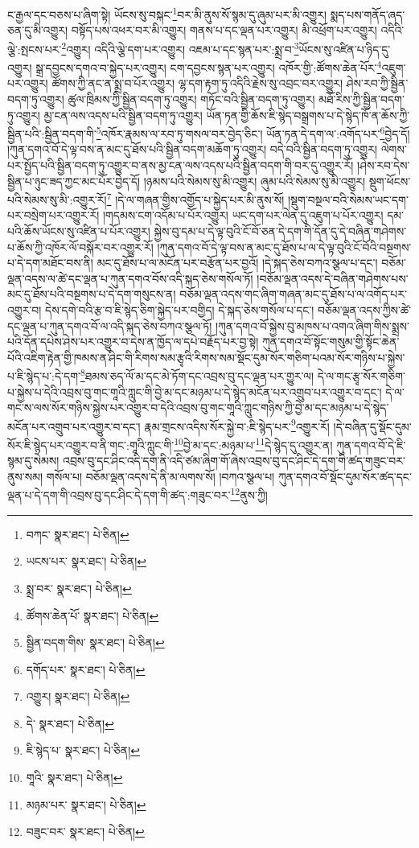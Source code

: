 ང་རྒྱལ་དང་བཅས་པ་ཞིག་སྟེ། ཡོངས་སུ་བསྐང་\footnote{བཀང་  སྣར་ཐང་།  པེ་ཅིན། }བར་མི་ནུས་སོ་སྙམ་དུ་ཞུམ་པར་མི་འགྱུར། སྨད་པས་གནོད་ཞད་ཅན་དུ་མི་འགྱུར། བསྟོད་པས་འཕར་བར་མི་འགྱུར། གནས་པ་དང་ལྡན་པར་འགྱུར། མི་འཕྲོག་པར་འགྱུར། འདིའི་ལྕེ་:སྤངས་པར་\footnote{ཡངས་པར་  སྣར་ཐང་།  པེ་ཅིན། }འགྱུར། འདིའི་ལྕེ་དག་པར་འགྱུར། འཇམ་པ་དང་སྙན་པར་:སྨྲ་བ་\footnote{སྨྲ་བར་  སྣར་ཐང་།  པེ་ཅིན། }ཡོངས་སུ་འཛིན་པ་ཉིད་དུ་འགྱུར། སྒྲ་དབྱངས་དགའ་བ་སྐྱེད་པར་འགྱུར། ངག་དབྱངས་སྙན་པར་འགྱུར། འཁོར་གྱི་:ཚོགས་ཆེན་པོར་\footnote{ཚོགས་ཆེན་པོ་  སྣར་ཐང་།  པེ་ཅིན། }འཇུག་པར་འགྱུར། ཚོགས་ཀྱི་ནང་ན་སྨྲ་བ་པོར་འགྱུར། ལྷ་དག་རྟག་ཏུ་འདིའི་རྗེས་སུ་འབྲང་བར་འགྱུར། ཤེས་རབ་ཀྱི་སྦྱིན་བདག་ཏུ་འགྱུར། ཚུལ་ཁྲིམས་ཀྱི་སྦྱིན་བདག་ཏུ་འགྱུར། གཏོང་བའི་སྦྱིན་བདག་ཏུ་འགྱུར། མཐོ་རིས་ཀྱི་སྦྱིན་བདག་ཏུ་འགྱུར། མྱ་ངན་ལས་འདས་པའི་སྦྱིན་བདག་ཏུ་འགྱུར། ཡོན་ཏན་གྱི་ཆོས་ཇི་སྙེད་བསྒྲགས་པ་དེ་སྙེད་ཁོ་ན་ཆོས་ཀྱི་སྦྱིན་པའི་:སྦྱིན་བདག་གི་\footnote{སྦྱིན་བདག་གིས་  སྣར་ཐང་།  པེ་ཅིན། }འཁོར་རྣམས་ལ་རབ་ཏུ་གསལ་བར་བྱེད་ཅིང་། ཡོན་ཏན་དེ་དག་ལ་:འགོད་པར་\footnote{དགོད་པར་  སྣར་ཐང་།  པེ་ཅིན། }བྱེད་དོ། །ཀུན་དགའ་བོ་དེ་ལྟ་བས་ན་མང་དུ་ཐོས་པའི་སྦྱིན་བདག་མཆོག་ཏུ་འགྱུར། བདེ་བའི་སྦྱིན་བདག་ཏུ་འགྱུར། ལེགས་པར་སྤྱོད་པའི་སྦྱིན་བདག་ཏུ་འགྱུར་བ་ནས་མྱ་ངན་ལས་འདས་པའི་སྦྱིན་བདག་གི་བར་དུ་འགྱུར་རོ། །ཤེས་རབ་དེས་སྦྱིན་པ་ཉུང་ཟད་ཀྱང་མང་པོར་བྱེད་དོ། །ཉམས་པའི་སེམས་སུ་མི་འགྱུར། ཞུམ་པའི་སེམས་སུ་མི་འགྱུར། སྡུག་ཕོངས་པའི་སེམས་སུ་མི་:འགྱུར་རོ།\footnote{འགྱུར།  སྣར་ཐང་།  པེ་ཅིན། } །དེ་ལ་གཞན་གྱིས་འགྱོད་པ་སྐྱེད་པར་མི་ནུས་སོ། །སྡུག་བསྔལ་བའི་སེམས་ཡང་དག་པར་བསྲེག་པར་འགྱུར་རོ། །གདམས་ངག་འདོམ་པ་པོར་འགྱུར། ཡང་དག་པར་ལེན་དུ་འཇུག་པ་པོར་འགྱུར། དམ་པའི་ཆོས་ཡོངས་སུ་འཛིན་པ་པོར་འགྱུར། སྐྱེས་བུ་དམ་པ་དེ་ལྟ་བུའི་ངོ་བོ་ཅན་དེ་དག་གི་དོན་དུ་དེ་བཞིན་གཤེགས་པ་ཆོས་ཀྱི་འཁོར་ལོ་བསྐོར་བར་འགྱུར་རོ། །ཀུན་དགའ་བོ་དེ་ལྟ་བས་ན་མང་དུ་ཐོས་པ་ལ་དེ་ལྟ་བུའི་ངོ་བོའི་བསྔགས་པ་དེ་དག་མཐོང་བས་ནི། མང་དུ་ཐོས་པ་ལ་མངོན་པར་བརྩོན་པར་བྱའོ། །དེ་སྐད་ཅེས་བཀའ་སྩལ་པ་དང་། བཅོམ་ལྡན་འདས་ལ་ཚེ་དང་ལྡན་པ་ཀུན་དགའ་བོས་འདི་སྐད་ཅེས་གསོལ་ཏོ། །བཅོམ་ལྡན་འདས་དེ་བཞིན་གཤེགས་པས་མང་དུ་ཐོས་པའི་བསྔགས་པ་དེ་དག་གསུངས་ན། བཅོམ་ལྡན་འདས་གང་ཞིག་གཞན་མང་དུ་ཐོས་པ་ལ་འགོད་པར་འགྱུར་བ། དེས་དགེ་བའི་རྩ་བ་ཇི་སྙེད་ཅིག་སྐྱེད་པར་བགྱིད། དེ་སྐད་ཅེས་གསོལ་པ་དང་། བཅོམ་ལྡན་འདས་ཀྱིས་ཚེ་དང་ལྡན་པ་ཀུན་དགའ་བོ་ལ་འདི་སྐད་ཅེས་བཀའ་སྩལ་ཏོ། །ཀུན་དགའ་བོ་སྐྱེས་བུ་མཁས་པ་འགའ་ཞིག་གིས་སྨྲས་པའི་དོན་དཔེས་ཤེས་པར་འགྱུར་བ་དེས་ན་ཁྱོད་ལ་དཔེ་བརྗོད་པར་བྱ་སྟེ། ཀུན་དགའ་བོ་སྟོང་གསུམ་གྱི་སྟོང་ཆེན་པོའི་འཇིག་རྟེན་གྱི་ཁམས་ན་ཤིང་གི་རིགས་སམ་རྩྭའི་རིགས་སམ་སྡོང་དུམ་སོར་གཅིག་པའམ་སོར་གཉིས་པ་སྐྱེས་པ་ཇི་སྙེད་པ་:དེ་དག་\footnote{དེ་  སྣར་ཐང་།  པེ་ཅིན། }ཐམས་ཅད་ལོ་མ་དང་མེ་ཏོག་དང་འབྲས་བུ་དང་ལྡན་པར་གྱུར་ལ། དེ་ལ་གང་རྩྭ་སོར་གཅིག་པ་སྐྱེས་པ་དེའི་འབྲས་བུ་གང་གཱའི་ཀླུང་གི་བྱེ་མ་དང་མཉམ་པ་དེ་སྙེད་མངོན་པར་འགྲུབ་པར་འགྱུར་བ་དང་། དེ་ལ་གང་ས་ལས་སོར་གཉིས་སྐྱེས་པར་འགྱུར་བ་དེའི་འབྲས་བུ་གང་གཱའི་ཀླུང་གཉིས་ཀྱི་བྱེ་མ་དང་མཉམ་པ་དེ་སྙེད་མངོན་པར་འགྲུབ་པར་འགྱུར་བ་དང་། རྣམ་གྲངས་འདིས་སོར་སྐྱེ་བ་:ཇི་སྙེད་པར་\footnote{ཇི་སྙེད་པ་  སྣར་ཐང་།  པེ་ཅིན། }འགྱུར་རོ། །དེ་བཞིན་དུ་སྡོང་དུམ་སོར་ཇི་སྙེད་པར་འགྱུར་བ་ནི་གང་:གཱའི་ཀླུང་གི་\footnote{གཱའི་  སྣར་ཐང་།  པེ་ཅིན། }བྱེ་མ་དང་:མཉམ་པ་\footnote{མཉམ་པར་  སྣར་ཐང་།  པེ་ཅིན། }དེ་སྙེད་དུ་འགྱུར་ན། ཀུན་དགའ་བོ་དེ་ཇི་སྙམ་དུ་སེམས། འབྲས་བུ་དང་ཤིང་འདི་དག་ནི་འདི་ཙམ་ཞིག་གོ་ཞེས་འབྲས་བུ་དང་ཤིང་དེ་དག་གི་ཚད་གཟུང་བར་ནུས་སམ། གསོལ་པ། བཅོམ་ལྡན་འདས་དེ་ནི་མ་ལགས་སོ། །བཀའ་སྩལ་པ། ཀུན་དགའ་བོ་སྡོང་དུམ་སོར་ཚད་དང་ལྡན་པ་དེ་དག་གི་འབྲས་བུ་དང་ཤིང་དེ་དག་གི་ཚད་:གཟུང་བར་\footnote{བཟུང་བར་  སྣར་ཐང་།  པེ་ཅིན། }ནུས་ཀྱི། 